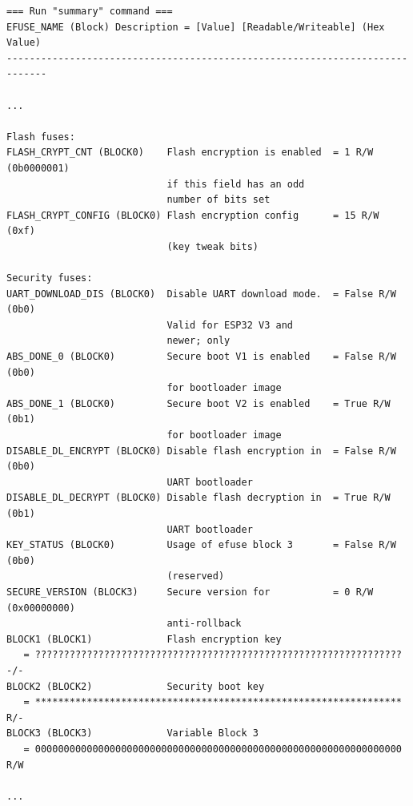 \documentclass[a4paper]{article}
\begin{document}
\begin{lstlisting}[breaklines=false, basicstyle=\ttfamily\scriptsize]
=== Run "summary" command ===
EFUSE_NAME (Block) Description = [Value] [Readable/Writeable] (Hex Value)
-----------------------------------------------------------------------------

...

Flash fuses:
FLASH_CRYPT_CNT (BLOCK0)    Flash encryption is enabled  = 1 R/W (0b0000001)
                            if this field has an odd
                            number of bits set                             
FLASH_CRYPT_CONFIG (BLOCK0) Flash encryption config      = 15 R/W (0xf)
                            (key tweak bits)

Security fuses:
UART_DOWNLOAD_DIS (BLOCK0)  Disable UART download mode.  = False R/W (0b0)
                            Valid for ESP32 V3 and 
                            newer; only                                      
ABS_DONE_0 (BLOCK0)         Secure boot V1 is enabled    = False R/W (0b0)
                            for bootloader image
ABS_DONE_1 (BLOCK0)         Secure boot V2 is enabled    = True R/W (0b1)
                            for bootloader image
DISABLE_DL_ENCRYPT (BLOCK0) Disable flash encryption in  = False R/W (0b0)
                            UART bootloader
DISABLE_DL_DECRYPT (BLOCK0) Disable flash decryption in  = True R/W (0b1)
                            UART bootloader
KEY_STATUS (BLOCK0)         Usage of efuse block 3       = False R/W (0b0)
                            (reserved)
SECURE_VERSION (BLOCK3)     Secure version for           = 0 R/W (0x00000000)
                            anti-rollback
BLOCK1 (BLOCK1)             Flash encryption key                              
   = ???????????????????????????????????????????????????????????????? -/- 
BLOCK2 (BLOCK2)             Security boot key                                 
   = **************************************************************** R/- 
BLOCK3 (BLOCK3)             Variable Block 3                                  
   = 0000000000000000000000000000000000000000000000000000000000000000 R/W 

...
\end{lstlisting}
\end{document}
